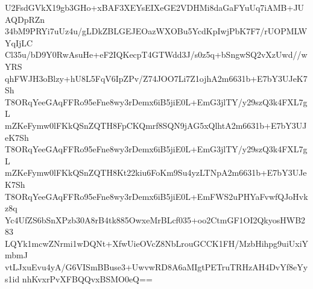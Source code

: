 U2FsdGVkX19gb3GHo+xBAF3XEYsEIXeGE2VDHMi8daGaFYuUq7iAMB+JUAQDpRZn
34bM9PRYi7uUz4u/gLDkZBLGEJEOazWXOBu5YcdKpIwjPbK7F7/rUOPMLWYqIjLC
Cl35u/bD9Y0RwAsuHe+eF2IQKecpT4GTWdd3J/s0z5q+bSngwSQ2vXzUwd//wYRS
qhFWJH3oBlzy+hU8L5FqV6IpZPv/Z74JOO7Li7Z1ojhA2m6631b+E7bY3UJeK7Sh
T8ORqYeeGAqFFRo95eFne8wy3rDemx6iB5jiE0L+EmG3jlTY/y29szQ3k4FXL7gL
mZKeFymw0lFKkQSnZQTH8FpCKQmrf8SQN9jAG5xQlhtA2m6631b+E7bY3UJeK7Sh
T8ORqYeeGAqFFRo95eFne8wy3rDemx6iB5jiE0L+EmG3jlTY/y29szQ3k4FXL7gL
mZKeFymw0lFKkQSnZQTH8Kt22kiu6FoKm9Su4yzLTNpA2m6631b+E7bY3UJeK7Sh
T8ORqYeeGAqFFRo95eFne8wy3rDemx6iB5jiE0L+EmFWS2uPHYaFvwfQJoHvkz8q
Yc4UfZS6bSnXPzb30A8rB4tk885OwxeMrBLcf035+oo2CtmGF1OI2QkyosHWB283
LQYk1mcwZNrmi1wDQNt+XfwUieOVcZ8NbLrouGCCK1FH/MzbHihpg9uiUxiYmbmJ
vtLJxuEvu4yA/G6VISmBBuse3+UwvwRD8A6aMIgtPETruTRHzAH4DvYf8eYys1id
nhKvxrPvXFBQQvxBSMO0eQ==
